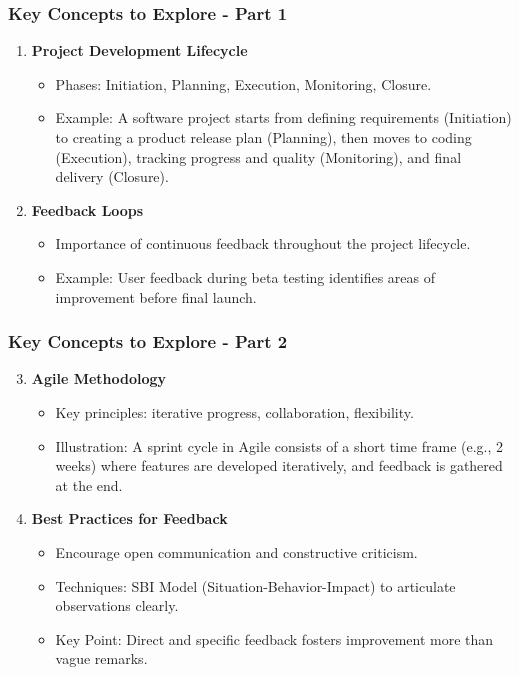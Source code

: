 \documentclass[aspectratio=169]{beamer}
\begin{document}
\begin{frame}[fragile]
    \frametitle{Key Concepts to Explore - Part 1}
    \begin{enumerate}
        \item \textbf{Project Development Lifecycle}
            \begin{itemize}
                \item Phases: Initiation, Planning, Execution, Monitoring, Closure.
                \item Example: A software project starts from defining requirements (Initiation) to creating a product release plan (Planning), then moves to coding (Execution), tracking progress and quality (Monitoring), and final delivery (Closure).
            \end{itemize}
        
        \item \textbf{Feedback Loops}
            \begin{itemize}
                \item Importance of continuous feedback throughout the project lifecycle.
                \item Example: User feedback during beta testing identifies areas of improvement before final launch.
            \end{itemize}
    \end{enumerate}
\end{frame}

\begin{frame}[fragile]
    \frametitle{Key Concepts to Explore - Part 2}
    \begin{enumerate}
        \setcounter{enumi}{2} %
        \item \textbf{Agile Methodology}
            \begin{itemize}
                \item Key principles: iterative progress, collaboration, flexibility.
                \item Illustration: A sprint cycle in Agile consists of a short time frame (e.g., 2 weeks) where features are developed iteratively, and feedback is gathered at the end.
            \end{itemize}

        \item \textbf{Best Practices for Feedback}
            \begin{itemize}
                \item Encourage open communication and constructive criticism.
                \item Techniques: SBI Model (Situation-Behavior-Impact) to articulate observations clearly.
                \item Key Point: Direct and specific feedback fosters improvement more than vague remarks.
            \end{itemize}
    \end{enumerate}
\end{frame}
\end{document}
